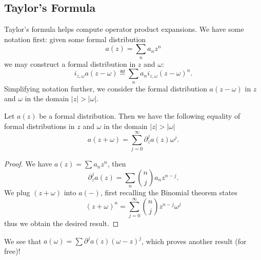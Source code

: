 \subsection{Taylor's Formula}

\M
Taylor's formula helps compute operator product expansions. We have some
notation first: given some formal distribution 
\begin{equation}
a(z)=\sum_{n}a_{n}z^{n}
\end{equation}
we may construct a formal distribution in $z$ and $\omega$:
\begin{equation}
i_{z,\omega}a(z-\omega)\eqdef\sum_{n} a_{n}i_{z,\omega}(z-\omega)^{n}.
\end{equation}
Simplifying notation further, we consider the formal distribution
$a(z-\omega)$ in $z$ and $\omega$ in the domain $|z|>|\omega|$.

\begin{prop}
Let $a(z)$ be a formal distribution. Then we have the following equality
of formal distributions in $z$ and $\omega$ in the domain $|z|>|\omega|$
\begin{equation}
a(z+\omega)=\sum^{\infty}_{j=0}\partial_{z}^{j}a(z)\omega^{j}.
\end{equation}
\end{prop}
\begin{proof}
We have $a(z)=\sum a_{n}z^{n}$, then
\begin{equation}
\partial_{z}^{j}a(z)=\sum_{n}{n\choose j}a_{n}z^{n-j}.
\end{equation}
We plug $(z+\omega)$ into $a(-)$, first recalling the Binomial theorem states
\begin{equation}
(z+\omega)^{n}=\sum^{\infty}_{j=0}{n\choose j}z^{n-j}\omega^{j}
\end{equation}
thus we obtain the desired result.
\end{proof}

\begin{rmk}
We see that $a(\omega)=\sum\partial^{j}a(z)(\omega-z)^{j}$, which proves
another result (for free)!
\end{rmk}


